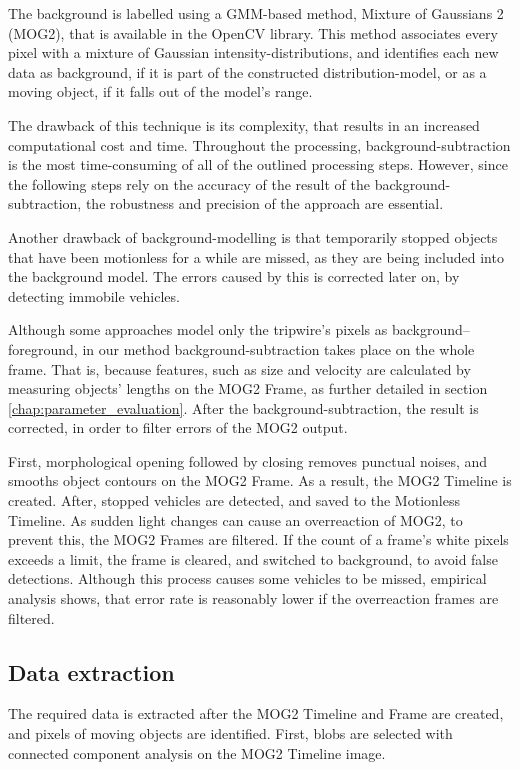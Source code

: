 The background is labelled using a GMM-based method, Mixture of Gaussians 2 (MOG2), that is available in the OpenCV library.
This method associates every pixel with a mixture of Gaussian intensity-distributions, and identifies each new data as background, if it is part of the constructed distribution-model, or as a moving object, if it falls out of the model's range.

The drawback of this technique is its complexity, that results in an increased computational cost and time.
Throughout the processing, background-subtraction is the most time-consuming of all of the outlined processing steps.
However, since the following steps rely on the accuracy of the result of the background-subtraction, the robustness and precision of the approach are essential.

Another drawback of background-modelling is that temporarily stopped objects that have been motionless for a while are missed, as they are being included into the background model.
The errors caused by this is corrected later on, by detecting immobile vehicles.

Although some approaches model only the tripwire's pixels as background--foreground, in our method background-subtraction takes place on the whole frame.
That is, because features, such as size and velocity are calculated by measuring objects' lengths on the MOG2 Frame, as further detailed in section \ref{chap:parameter_evaluation}.
After the background-subtraction, the result is corrected, in order to filter errors of the MOG2 output.

First, morphological opening followed by closing removes punctual noises, and smooths object contours on the MOG2 Frame.
As a result, the MOG2 Timeline is created.
After, stopped vehicles are detected, and saved to the Motionless Timeline.
As sudden light changes can cause an overreaction of MOG2, to prevent this, the MOG2 Frames are filtered.
If the count of a frame's white pixels exceeds a limit, the frame is cleared, and switched to background, to avoid false detections.
Although this process causes some vehicles to be missed, empirical analysis shows, that error rate is reasonably lower if the overreaction frames are filtered.
\subsection{Data extraction}
The required data is extracted after the MOG2 Timeline and Frame are created, and pixels of moving objects are identified.
First, blobs are selected with connected component analysis on the MOG2 Timeline image.

